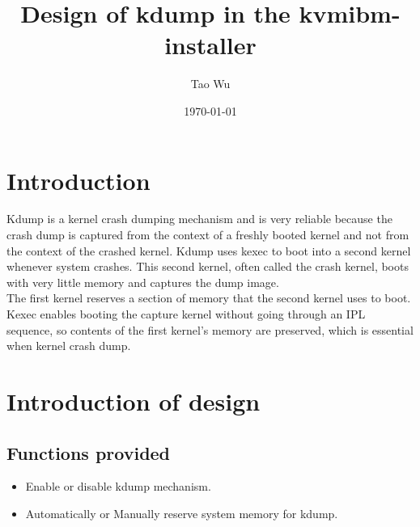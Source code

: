 \documentclass{article}
\begin{document}
\title{\textbf{Design of kdump in the kvmibm-installer}}
\author{Tao Wu}
\date{\today}
\maketitle
\section{Introduction}
Kdump is a kernel crash dumping mechanism and is very reliable because the crash
dump is captured from the context of a freshly booted kernel and not from the
context of the crashed kernel. Kdump uses kexec to boot into a second kernel
whenever system crashes. This second kernel, often called the crash kernel,
boots with very little memory and captures the dump image. \\

The first kernel reserves a section of memory that the second kernel uses to
boot. Kexec enables booting the capture kernel without going through an IPL
sequence, so contents of the first kernel's memory are preserved, which is
essential when kernel crash dump. \\

\section{Introduction of design}

\subsection{Functions provided}
\begin{itemize}
\item Enable or disable kdump mechanism.
\item Automatically or Manually reserve system memory for kdump.
\end{itemize}
\noindent
\end{document}
